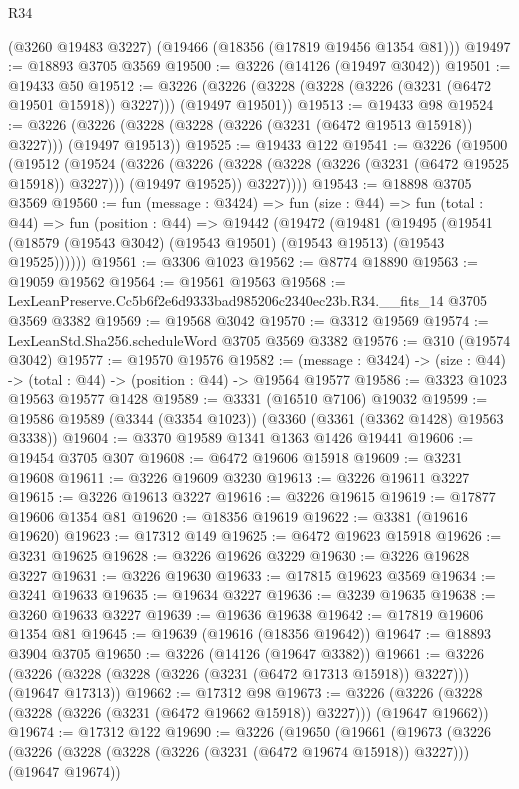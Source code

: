 \begin{lexlean}{R34}
\begin{coremodule}
    (@3260 @19483 @3227)
    (@19466 (@18356 (@17819 @19456 @1354 @81)))
@19497 := @18893 @3705 @3569
@19500 := @3226 (@14126 (@19497 @3042))
@19501 := @19433 @50
@19512 := @3226 (@3226 (@3228 (@3228 (@3226 (@3231 (@6472 @19501 @15918)) @3227))) (@19497 @19501))
@19513 := @19433 @98
@19524 := @3226 (@3226 (@3228 (@3228 (@3226 (@3231 (@6472 @19513 @15918)) @3227))) (@19497 @19513))
@19525 := @19433 @122
@19541 := @3226
    (@19500
      (@19512
        (@19524
          (@3226
            (@3226 (@3228 (@3228 (@3226 (@3231 (@6472 @19525 @15918)) @3227))) (@19497 @19525))
            @3227))))
@19543 := @18898 @3705 @3569
@19560 := fun (message : @3424) =>
  fun (size : @44) =>
  fun (total : @44) =>
  fun (position : @44) =>
  @19442
    (@19472
      (@19481
        (@19495 (@19541 (@18579 (@19543 @3042) (@19543 @19501) (@19543 @19513) (@19543 @19525))))))
@19561 := @3306 @1023
@19562 := @8774 @18890
@19563 := @19059 @19562
@19564 := @19561 @19563
@19568 := LexLeanPreserve.Cc5b6f2e6d9333bad985206c2340ec23b.R34.__fits_14 @3705 @3569 @3382
@19569 := @19568 @3042
@19570 := @3312 @19569
@19574 := LexLeanStd.Sha256.scheduleWord @3705 @3569 @3382
@19576 := @310 (@19574 @3042)
@19577 := @19570 @19576
@19582 := (message : @3424) -> (size : @44) -> (total : @44) -> (position : @44) -> @19564 @19577
@19586 := @3323 @1023 @19563 @19577 @1428
@19589 := @3331 (@16510 @7106) @19032
@19599 := @19586 @19589 (@3344 (@3354 @1023)) (@3360 (@3361 (@3362 @1428) @19563 @3338))
@19604 := @3370 @19589 @1341 @1363 @1426 @19441
@19606 := @19454 @3705 @307
@19608 := @6472 @19606 @15918
@19609 := @3231 @19608
@19611 := @3226 @19609 @3230
@19613 := @3226 @19611 @3227
@19615 := @3226 @19613 @3227
@19616 := @3226 @19615
@19619 := @17877 @19606 @1354 @81
@19620 := @18356 @19619
@19622 := @3381 (@19616 @19620)
@19623 := @17312 @149
@19625 := @6472 @19623 @15918
@19626 := @3231 @19625
@19628 := @3226 @19626 @3229
@19630 := @3226 @19628 @3227
@19631 := @3226 @19630
@19633 := @17815 @19623 @3569
@19634 := @3241 @19633
@19635 := @19634 @3227
@19636 := @3239 @19635
@19638 := @3260 @19633 @3227
@19639 := @19636 @19638
@19642 := @17819 @19606 @1354 @81
@19645 := @19639 (@19616 (@18356 @19642))
@19647 := @18893 @3904 @3705
@19650 := @3226 (@14126 (@19647 @3382))
@19661 := @3226 (@3226 (@3228 (@3228 (@3226 (@3231 (@6472 @17313 @15918)) @3227))) (@19647 @17313))
@19662 := @17312 @98
@19673 := @3226 (@3226 (@3228 (@3228 (@3226 (@3231 (@6472 @19662 @15918)) @3227))) (@19647 @19662))
@19674 := @17312 @122
@19690 := @3226
    (@19650
      (@19661
        (@19673
          (@3226
            (@3226 (@3228 (@3228 (@3226 (@3231 (@6472 @19674 @15918)) @3227))) (@19647 @19674))

\end{coremodule}
\end{lexlean}
